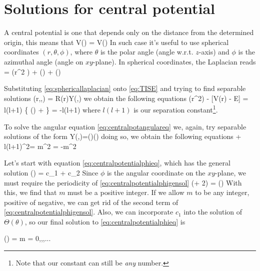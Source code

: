 \documentclass[oneside, 12pt, notitlepage]{book}
\begin{document}
\pagestyle{mynotespage}

\chapter{Solutions for central potential}

A central potential is one that depends only on the distance from the determined origin, this means that
\beq[] V() = V() \eeq
In such case it's useful to use spherical coordinates \( (r,\theta, \phi) \), where \(\theta\) is the polar angle (angle w.r.t. \(z\)-axis) and \(\phi\) is the azimuthal angle (angle on \(xy\)-plane). In spherical coordinates, the Laplacian reads
\beq[eq:sphericallaplacian] \laplacian =  \left(r^2 \right) + \pdv{\theta}(\sin\theta\pdv{\theta}) + \left(\pdv[2]{\phi}\right) \eeq \par

Substituting \eqref{eq:sphericallaplacian} onto \eqref{eq:TISE} and trying to find separable solutions
\beq[] \psi(r,\theta,\phi) = R(r)Y(\theta,\phi) \eeq
we obtain the following equations
\beq[eq:centralpotentialradialeq]  (r^2) - [V(r) - E] = l(l+1) \eeq
\beq[eq:centralpotangulareq] \left\{ \pdv{\theta}(\sin\theta{}) +  \right\} = -l(l+1) \eeq
where \(l(l+1)\) is our separation constant\footnote{Note that our constant can still be \textit{any} number.}.\par

To solve the angular equation \eqref{eq:centralpotangulareq} we, again, try separable solutions of the form
\beq[eq:centralpotentialangulareq] Y(\theta,\phi)=\Theta(\theta)\Phi(\phi) \eeq
doing so, we obtain the following equations
\beq[eq:centralpotentialthetaeq] \left[\sin\theta\dv{\theta}\left( \sin\theta\dv{\Theta}{\theta}\right) \right] + l(l+1)\sin^2\theta = m^2 \eeq
\beq[eq:centralpotentialphieq] \dv[2]{\Phi}{\phi} = -m^2 \eeq\par

Let's start with equation \eqref{eq:centralpotentialphieq}, which has the general solution
\beq[eq:centralpotentialphigensol] \Phi(\phi) = c_1 + c_2 \eeq
Since \(\phi\) is the angular coordinate on the \(xy\)-plane, we must require the periodicity of \eqref{eq:centralpotentialphigensol}
\beq[] \Phi(\phi + 2\pi) = \Phi(\phi) \eeq
With this, we find that \(m\) must be a positive integer. If we allow \(m\) to be any integer, positive of negative, we can get rid of the second term of \eqref{eq:centralpotentialphigensol}. Also, we can incorporate \(c_1\) into the solution of \(\Theta(\theta)\), so our final solution to \eqref{eq:centralpotentialphieq} is
\begin{tcolorbox}
\beq[] \Phi(\phi) =   m = 0,,,... \eeq \end{tcolorbox}\par
\end{document}

